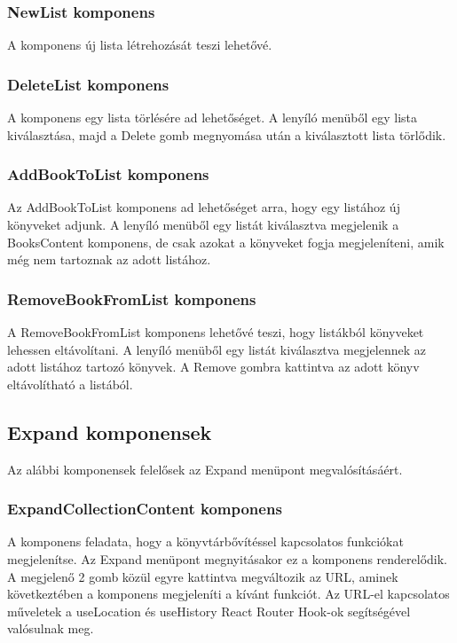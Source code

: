 \subsubsection{NewList komponens}
A komponens új lista létrehozását teszi lehetővé.

\subsubsection{DeleteList komponens}
A komponens egy lista törlésére ad lehetőséget. A lenyíló menüből egy lista kiválasztása, majd a Delete gomb megnyomása után a kiválasztott lista törlődik.

\subsubsection{AddBookToList komponens}
Az AddBookToList komponens ad lehetőséget arra, hogy egy listához új könyveket adjunk. A lenyíló menüből egy listát kiválasztva megjelenik a BooksContent komponens, de csak azokat a könyveket fogja megjeleníteni, amik még nem tartoznak az adott listához.

\subsubsection{RemoveBookFromList komponens}
A RemoveBookFromList komponens lehetővé teszi, hogy listákból könyveket lehessen eltávolítani. A lenyíló menüből egy listát kiválasztva megjelennek az adott listához tartozó könyvek. A Remove gombra kattintva az adott könyv eltávolítható a listából.

\subsection{Expand komponensek}
Az alábbi komponensek felelősek az Expand menüpont megvalósításáért.

\subsubsection{ExpandCollectionContent komponens}
A komponens feladata, hogy a könyvtárbővítéssel kapcsolatos funkciókat megjelenítse. Az Expand menüpont megnyitásakor ez a komponens renderelődik. A megjelenő 2 gomb közül egyre kattintva megváltozik az URL, aminek következtében a komponens megjeleníti a kívánt funkciót. Az URL-el kapcsolatos műveletek a useLocation és useHistory React Router Hook-ok segítségével valósulnak meg.

